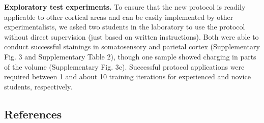 \documentclass{article}
\begin{document}
\textbf{Exploratory test experiments.} To ensure that the new protocol is readily applicable to other cortical areas and can be easily implemented by other experimentalists, we asked two students in the laboratory to use the protocol without direct supervision (just based on written instructions). Both were able to conduct successful stainings in somatosensory and parietal cortex (Supplementary Fig. 3 and Supplementary Table 2), though one sample showed charging in parts of the volume (Supplementary Fig. 3c). Successful protocol applications were required between 1 and about 10 training iterations for experienced and novice students, respectively.

\subsection*{References}
\end{document}
